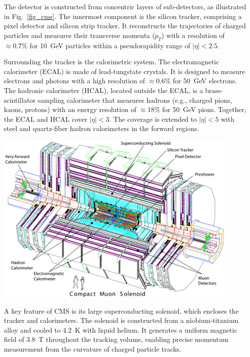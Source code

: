 The detector is constructed from concentric layers of sub-detectors, as illustrated in Fig.~\ref{fig_cms}. The innermost component is the silicon tracker, comprising a pixel detector and silicon strip tracker. It reconstructs the trajectories of charged particles and measures their transverse momenta ($p_T$) with a resolution of $\approx 0.7\%$ for 10~GeV particles within a pseudorapidity range of $|\eta| < 2.5$.

Surrounding the tracker is the calorimetric system. The electromagnetic calorimeter (ECAL) is made of lead-tungstate crystals. It is designed to measure electrons and photons with a high resolution of $\approx 0.6\%$ for 50~GeV electrons. The hadronic calorimeter (HCAL), located outside the ECAL, is a brass-scintillator sampling calorimeter that measures hadrons (e.g., charged pions, kaons, protons) with an energy resolution of $\approx 18\%$ for 50~GeV pions. Together, the ECAL and HCAL cover $|\eta| < 3$. The coverage is extended to $|\eta| < 5$ with steel and quartz-fiber hadron calorimeters in the forward regions.


\begin{center}
	\includegraphics[width=0.9\textwidth]{Images/CMS.png}
	\label{fig_cms}
\end{center}

A key feature of CMS is its large superconducting solenoid, which encloses the tracker and calorimeters. The solenoid is constructed from a niobium-titanium alloy and cooled to 4.2~K with liquid helium. It generates a uniform magnetic field of 3.8~T throughout the tracking volume, enabling precise momentum measurement from the curvature of charged particle tracks.

